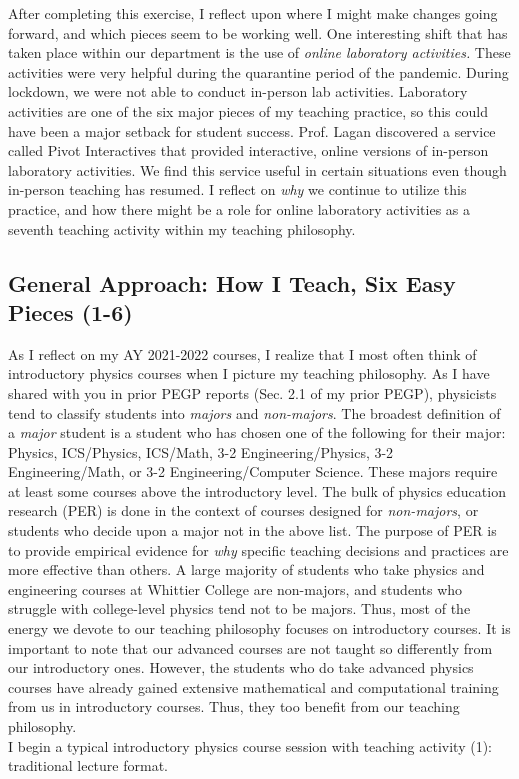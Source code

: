 \documentclass[../../../main.tex]{subfiles}
\begin{document}
After completing this exercise, I reflect upon where I might make changes going forward, and which pieces seem to be working well.  One interesting shift that has taken place within our department is the use of \textit{online laboratory activities.}  These activities were very helpful during the quarantine period of the pandemic.  During lockdown, we were not able to conduct in-person lab activities.  Laboratory activities are one of the six major pieces of my teaching practice, so this could have been a major setback for student success.  Prof. Lagan discovered a service called Pivot Interactives that provided interactive, online versions of in-person laboratory activities.  We find this service useful in certain situations even though in-person teaching has resumed.  I reflect on \textit{why} we continue to utilize this practice, and how there might be a role for online laboratory activities as a seventh teaching activity within my teaching philosophy. 

\subsection{General Approach: How I Teach, Six Easy Pieces (1-6)}

As I reflect on my AY 2021-2022 courses, I realize that I most often think of introductory physics courses when I picture my teaching philosophy.  As I have shared with you in prior PEGP reports (Sec. 2.1 of my prior PEGP), physicists tend to classify students into \textit{majors} and \textit{non-majors}.  The broadest definition of a \textit{major} student is a student who has chosen one of the following for their major: Physics, ICS/Physics, ICS/Math, 3-2 Engineering/Physics, 3-2 Engineering/Math, or 3-2 Engineering/Computer Science.  These majors require at least some courses above the introductory level.  The bulk of physics education research (PER) is done in the context of courses designed for \textit{non-majors}, or students who decide upon a major not in the above list.  The purpose of PER is to provide empirical evidence for \textit{why} specific teaching decisions and practices are more effective than others.  A large majority of students who take physics and engineering courses at Whittier College are non-majors, and students who struggle with college-level physics tend not to be majors.  Thus, most of the energy we devote to our teaching philosophy focuses on introductory courses.  It is important to note that our advanced courses are not taught so differently from our introductory ones. However, the students who do take advanced physics courses have already gained extensive mathematical and computational training from us in introductory courses.  Thus, they too benefit from our teaching philosophy.
\\
\vspace{0.25cm}
I begin a typical introductory physics course session with teaching activity (1): traditional lecture format.
\end{document}
